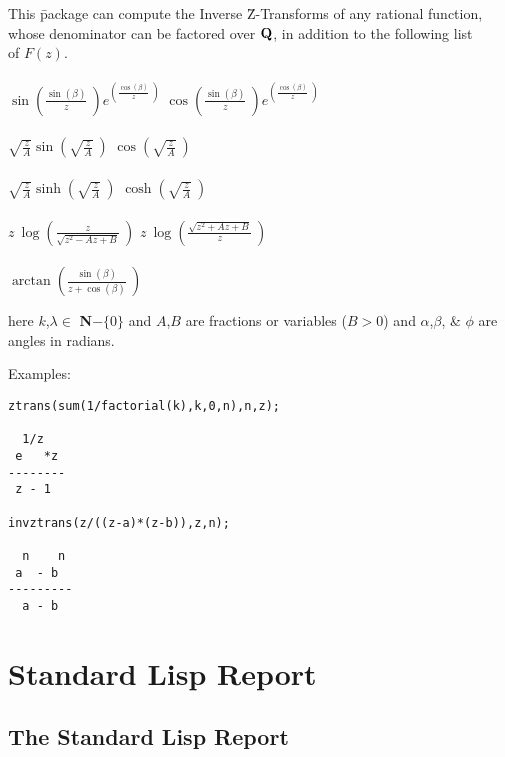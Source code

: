 \documentclass[11pt,letterpaper]{book}
\begin{document}
\begin{tabbing}
  This \= package can compute the Inverse \= Z-Transforms of any
  rational function, \\ whose denominator can be factored over
  ${\bf Q}$, in addition to the following list \\ of $F(z)$.\\ \\

\> $\sin \left(\frac{\sin (\beta)}{z} \ \right)
    e^{\left(\frac{\cos (\beta)}{z} \ \right)}$
\> $\cos \left(\frac{\sin (\beta)}{z} \ \right)
    e^{\left(\frac{\cos (\beta)}{z} \ \right)}$ \\ \\
\> $\sqrt{\frac{z}{A}} \sin \left( \sqrt{\frac{z}{A}} \ \right)$
\> $\cos \left( \sqrt{\frac{z}{A}} \ \right)$ \\ \\
\> $\sqrt{\frac{z}{A}} \sinh \left( \sqrt{\frac{z}{A}} \ \right)$
\> $\cosh \left( \sqrt{\frac{z}{A}} \ \right)$ \\ \\
\> $z \ \log \left(\frac{z}{\sqrt{z^2-A z+B}} \ \right)$
\> $z \ \log \left(\frac{\sqrt{z^2+A z+B}}{z} \ \right)$ \\ \\
\> $\arctan \left(\frac{\sin (\beta)}{z+\cos (\beta)} \ \right)$
\\
\end{tabbing}

here $k$,$\lambda \in$ {\bf N}$ -  \{0\}$ and $A$,$B$ are fractions
or variables ($B>0$) and $\alpha$,$\beta$, \&  $\phi$ are angles
in radians.

Examples:
{\small\begin{verbatim}
ztrans(sum(1/factorial(k),k,0,n),n,z);

  1/z
 e   *z
--------
 z - 1

invztrans(z/((z-a)*(z-b)),z,n);

  n    n
 a  - b
---------
  a - b
\end{verbatim}}

\part{Standard Lisp Report}
\setcounter{examplectr}{0}

\chapter{The Standard Lisp Report}
\label{SL}
\end{document}
